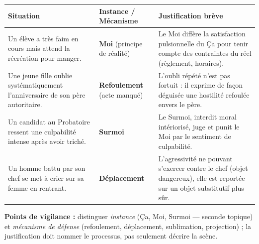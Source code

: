 \documentclass[11pt]{article}
\begin{document}
\begin{corrige}
\begin{center}
\begin{tabularx}{\linewidth}{|l|X|X|}\hline
\rowcolor{popblueL}\textbf{Situation} & \textbf{Instance / Mécanisme} & \textbf{Justification brève} \\ \hline
Un élève a très faim en cours mais attend la récréation pour manger. & \textbf{Moi} (principe de réalité) & Le Moi diffère la satisfaction pulsionnelle du Ça pour tenir compte des contraintes du réel (règlement, horaires). \\ \hline
Une jeune fille oublie systématiquement l'anniversaire de son père autoritaire. & \textbf{Refoulement} (acte manqué) & L'oubli répété n'est pas fortuit : il exprime de façon déguisée une hostilité refoulée envers le père. \\ \hline
Un candidat au Probatoire ressent une culpabilité intense après avoir triché. & \textbf{Surmoi} & Le Surmoi, interdit moral intériorisé, juge et punit le Moi par le sentiment de culpabilité. \\ \hline
Un homme battu par son chef se met à crier sur sa femme en rentrant. & \textbf{Déplacement} & L'agressivité ne pouvant s'exercer contre le chef (objet dangereux), elle est reportée sur un objet substitutif plus sûr. \\ \hline
\end{tabularx}
\end{center}
\textbf{Points de vigilance :} distinguer \emph{instance} (Ça, Moi, Surmoi — seconde topique) et \emph{mécanisme de défense} (refoulement, déplacement, sublimation, projection) ; la justification doit nommer le processus, pas seulement décrire la scène.
\end{corrige}
\end{document}
